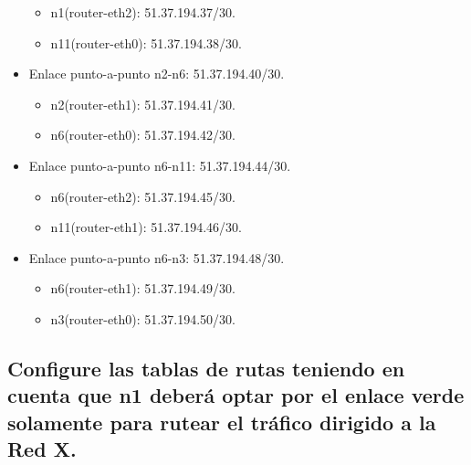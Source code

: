 \documentclass[11pt]{article} %
\begin{document}
\begin{itemize}
            \begin{itemize}
                \item n1(router-eth2): 51.37.194.37/30.
                \item n11(router-eth0): 51.37.194.38/30.
            \end{itemize}
            \item Enlace punto-a-punto n2-n6: 51.37.194.40/30.
            \begin{itemize}
                \item n2(router-eth1): 51.37.194.41/30.
                \item n6(router-eth0): 51.37.194.42/30.
            \end{itemize}
            \item Enlace punto-a-punto n6-n11: 51.37.194.44/30.
            \begin{itemize}
                \item n6(router-eth2): 51.37.194.45/30.
                \item n11(router-eth1): 51.37.194.46/30.
            \end{itemize}
            \item Enlace punto-a-punto n6-n3: 51.37.194.48/30.
            \begin{itemize}
                \item n6(router-eth1): 51.37.194.49/30.
                \item n3(router-eth0): 51.37.194.50/30.
            \end{itemize}
        \end{itemize}

        \subsection{Configure las tablas de rutas teniendo en cuenta que n1 deberá optar por el enlace verde solamente para rutear el tráfico dirigido a la Red X.}  
\end{document}
